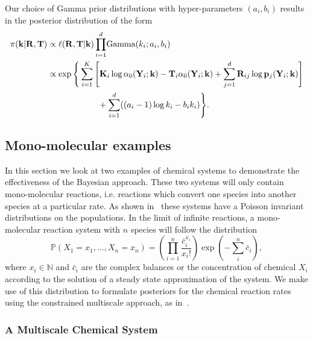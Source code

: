 \documentclass[final]{siamltex}
\begin{document}
Our choice of Gamma prior distributions with hyper-parameters $(a_i, b_i)$ results in the posterior distribution of the form
\begin{align}
	\pi(\mathbf{k}|\mathbf{R}, \mathbf{T}) &\propto \ell(\mathbf{R}, \mathbf{T}|\mathbf{k})
	\prod_{i=1}^d \! \text{Gamma}(k_i; a_i, b_i) \notag \\
		&\propto \exp\Bigg\{\sum\limits_{i=1}^K \Bigg[
				\mathbf{K}_i\log \alpha_0(\mathbf{Y}_i; \mathbf{k}) - \mathbf{T}_i\alpha_0(\mathbf{Y}_i; \mathbf{k}) %
				+\sum_{j=1}^d \mathbf{R}_{ij}\log\mathbf{p}_j(\mathbf{Y}_i; \mathbf{k})
			\Bigg]  \notag\\
		&	\qquad\qquad\qquad{} + \sum_{i=1}^d ((a_i-1)\log k_i - b_ik_i)\Bigg\}. \label{eqn:chem_posterior}
\end{align}

\subsection{Mono-molecular examples}

In this section we look at two examples of chemical systems to demonstrate the effectiveness of the Bayesian approach. These two systems will only contain mono-molecular reactions, i.e. reactions which convert one species into another species at a particular rate. As shown in~\cite{anderson2010product} these systems have a Poisson invariant distributions on the populations. In the limit of infinite reactions, a mono-molecular reaction system with $n$ species will follow the distribution
\begin{equation}\label{eqn:mono_stat_dist}
	\mathbb{P}(X_1=x_1, \ldots, X_n=x_n) = \left(\prod_{i=1}^n \! \frac{\bar{c}_i^{x_i}}{x_i!}\right)\exp\left(-\sum_i^n \! \bar{c}_i\right),
\end{equation}
where $x_i \in \mathbb{N}$ and $\bar{c}_i$ are the complex balances or the concentration of chemical $X_i$ according to the solution of a steady state approximation of the system. We make use of this distribution to formulate posteriors for the chemical reaction rates using the constrained multiscale approach, as in~\cite{cotter2016constrained}.


\subsubsection{A Multiscale Chemical System}\label{sec:chem_multiscale}
\end{document}
